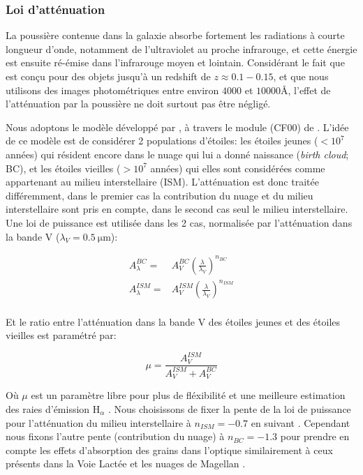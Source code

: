 \documentclass[../main/main.tex]{subfiles}
\begin{document}
\subsubsection{Loi d'atténuation}

La poussière contenue dans la galaxie absorbe fortement les radiations à courte longueur d'onde, notamment de l'ultraviolet au proche infrarouge, et cette énergie est ensuite ré-émise dans l'infrarouge moyen et lointain. Considérant le fait que \hypergal est conçu pour des objets jusqu'à un redshift de $z\approx0.1-0.15$, et que nous utilisons des images photométriques entre environ $4000$ et $10000$\AA, l'effet de l'atténuation par la poussière ne doit surtout pas être négligé.

Nous adoptons le modèle développé par \citet{CharlotFall2000}, à travers le module \textbf{} (CF00) de \cigale. L'idée de ce modèle est de considérer 2 populations d'étoiles: les étoiles jeunes ($<10^7$ années) qui résident encore dans le nuage qui lui a donné naissance (\textit{birth cloud}; BC), et les étoiles vieilles ($>10^7$ années) qui elles sont considérées comme appartenant au milieu interstellaire (ISM). L'atténuation est donc traitée différemment, dans le premier cas la contribution du nuage et du milieu interstellaire sont pris en compte, dans le second cas seul le milieu interstellaire. Une loi de puissance est utilisée dans les 2 cas, normalisée par l'atténuation dans la bande V ($\lambda_V=\SI{0.5}{\micro\metre}$):

\begin{align*}
  A_{\lambda}^{BC}=&A_{V}^{BC}\left(\frac{\lambda}{\lambda_V}\right)^{n_{BC}}\\
  A_{\lambda}^{ISM}=&A_{V}^{ISM}\left(\frac{\lambda}{\lambda_V}\right)^{n_{ISM}}
\end{align*}\\

Et le ratio entre l'atténuation dans la bande V des étoiles jeunes et des étoiles vieilles est paramétré par:

\begin{equation*}
  \mu=\frac{A_{V}^{ISM}}{A_{V}^{ISM}+A_{V}^{BC}}
\end{equation*}

Où $\mu$ est un paramètre libre pour plus de fléxibilité et une
meilleure estimation des raies d'émission $\text{H}_{\alpha}$
\citep{Battisti2016,Buat2018,Malek2018,Chevallard2019}.
Nous choisissons de fixer la pente de la loi de puissance pour l'atténuation du milieu interstellaire à $n_{ISM}=-0.7$ en suivant \citet{CharlotFall2000}. Cependant nous fixons l'autre pente (contribution du nuage) à $n_{BC}=-1.3$ pour prendre en compte les effets d'absorption des grains dans l'optique similairement à ceux présents dans la Voie Lactée et les nuages de Magellan \citep{LoFaro2017,Wild2007,Cunha2008MAGPHYS,Battisti2019}.
\end{document}
